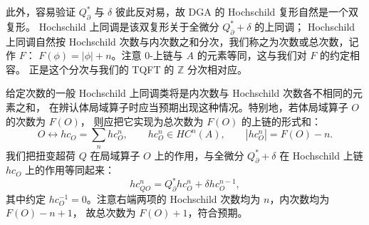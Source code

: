 此外，容易验证 $Q^*_\partial$ 与 $\delta$ 彼此反对易，故 DGA 的 Hochschild 复形自然是一个双复形。
Hochschild 上同调是该双复形关于全微分 $Q^*_\partial + \delta$ 的上同调；
Hochschild 上同调自然按 Hochschild 次数与内次数之和分次，我们称之为次数或总次数，记作 $F$：
$F(\phi) = |\phi| + n$。注意 0-上链与 $A$ 的元素等同，这与我们对 $F$ 的约定相容。
正是这个分次与我们的 TQFT 的 $\mathbb{Z}$ 分次相对应。

给定次数的一般 Hochschild 上同调类将是内次数与 Hochschild 次数各不相同的元素之和，
在辨认体局域算子时应当预期出现这种情况。特别地，若体局域算子 $O$ 的次数为 $F(O)$，
则应把它实现为总次数为 $F(O)$ 的上链的形式和：
\begin{equation}\tag{3.38}
O \leftrightarrow hc_O = \sum_n hc^n_O, \qquad hc^n_O\in HC^n(A), \qquad |hc^n_O| = F(O) - n .
\end{equation}
我们把扭变超荷 $Q$ 在局域算子 $O$ 上的作用，与全微分 $Q^*_\partial+\delta$ 在
Hochschild 上链 $hc_O$ 上的作用等同起来：
\begin{equation}\tag{3.39}
hc^n_{QO} = Q^*_\partial hc^n_O + \delta hc^{n-1}_O ,
\end{equation}
其中约定 $hc^{-1}_O = 0$。注意右端两项的 Hochschild 次数均为 $n$，内次数均为 $F(O)-n+1$，
故总次数为 $F(O)+1$，符合预期。

